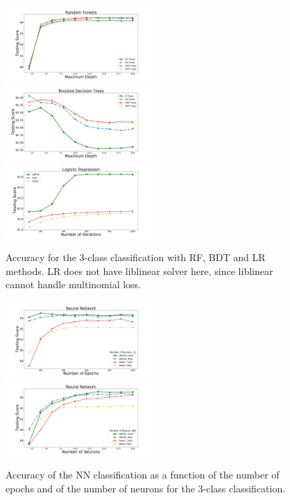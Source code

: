 \begin{figure}[h]
\center
\includegraphics[width=0.5\textwidth]{plots/rf_train_multi.pdf}\\
\includegraphics[width=0.5\textwidth]{plots/bdt_train_multi.pdf}
\includegraphics[width=0.5\textwidth]{plots/lr_train_multi.pdf}
\caption{Accuracy for the 3-class classification with RF, BDT and LR  methods. LR does not have liblinear solver here, since liblinear 
cannot handle multinomial  loss.
}
\label{fig:tree_multi}
\end{figure}

\begin{figure}[h]
\center
\includegraphics[width=0.5\textwidth]{plots/nn_epoch_train_multi.pdf}\\
\includegraphics[width=0.5\textwidth]{plots/nn_neuron_train_multi.pdf}
\caption{Accuracy of the NN classification as a function of the number of epochs and of the number of neurons
 for the 3-class classification. 
 }
\label{fig:nets_multi}
\end{figure}


